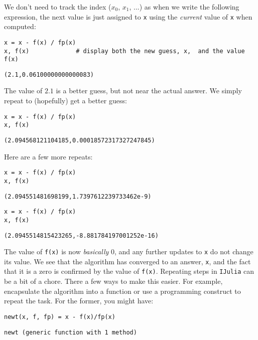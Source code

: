 \documentclass[12pt]{article}
\begin{document}
\newline
We don't need to track the index ($x_0$, $x_1$, ...) as when we write the following expression, the next value is just assigned to \texttt{x} using the \textit{current} value of \texttt{x} when computed:\begin{verbatim}
x = x - f(x) / fp(x)
x, f(x)				# display both the new guess, x,  and the value f(x)
\end{verbatim}
\begin{verbatim}
(2.1,0.06100000000000083)\end{verbatim}
\newline
The value of $2.1$ is a better guess, but not near the actual answer. We simply repeat to (hopefully) get a better guess:\begin{verbatim}
x = x - f(x) / fp(x)
x, f(x)
\end{verbatim}
\begin{verbatim}
(2.094568121104185,0.00018572317327247845)\end{verbatim}
\newline
Here are a few more repeats:\begin{verbatim}
x = x - f(x) / fp(x)
x, f(x)
\end{verbatim}
\begin{verbatim}
(2.094551481698199,1.7397612239733462e-9)\end{verbatim}
\begin{verbatim}
x = x - f(x) / fp(x)
x, f(x)
\end{verbatim}
\begin{verbatim}
(2.0945514815423265,-8.881784197001252e-16)\end{verbatim}
\newline
The value of \texttt{f(x)} is now \textit{basically} 0, and any further updates to \texttt{x} do not change its value. We see that the algorithm has converged to an answer, \texttt{x}, and the fact that it is a zero is confirmed by the value of \texttt{f(x)}.\newline
Repeating steps in \texttt{IJulia} can be a bit of a chore. There a few  ways to make this easier. For example, encapsulate the algorithm into a function or use a programming construct to repeat the task.\newline
For the former, you might have:\begin{verbatim}
newt(x, f, fp) = x - f(x)/fp(x)
\end{verbatim}
\begin{verbatim}
newt (generic function with 1 method)\end{verbatim}
\end{document}
